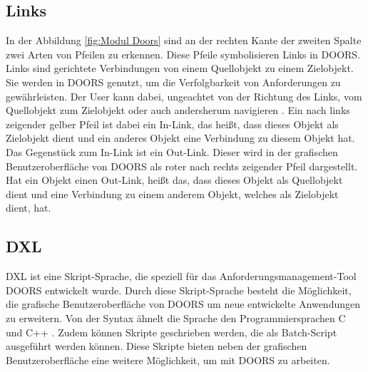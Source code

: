 \subsection{Links}
In der Abbildung \ref*{fig:Modul Doors} sind an der rechten Kante der zweiten Spalte zwei Arten von Pfeilen zu erkennen. Diese Pfeile
symbolisieren Links in \ac{DOORS}. Links sind gerichtete Verbindungen von einem Quellobjekt zu einem Zielobjekt. Sie werden in \ac{DOORS} 
genutzt, um die Verfolgbarkeit von Anforderungen zu gewährleisten. Der User kann 
dabei, ungeachtet von der Richtung des Links, vom Quellobjekt zum Zielobjekt oder auch andersherum navigieren \cite[S.183]{DOORS}. 
Ein nach links zeigender gelber Pfeil ist dabei ein In-Link, das heißt, dass dieses Objekt als Zielobjekt dient und ein anderes Objekt 
eine Verbindung zu diesem Objekt hat. Das Gegenstück zum In-Link ist ein Out-Link. Dieser wird in der grafischen Benutzeroberfläche von 
\ac{DOORS} als roter nach rechts zeigender Pfeil dargestellt. Hat ein Objekt einen Out-Link, heißt das, dass dieses Objekt als Quellobjekt 
dient und eine Verbindung zu einem anderem Objekt, welches als Zielobjekt dient, hat.   

\subsection{DXL}

\ac*{DXL} ist eine Skript-Sprache, die speziell für das Anforderungsmanagement-Tool \ac{DOORS} entwickelt wurde. Durch diese Skript-Sprache
besteht die Möglichkeit, die grafische Benutzeroberfläche von \ac{DOORS} um neue entwickelte Anwendungen zu
erweitern. Von der Syntax ähnelt die Sprache den Programmiersprachen C und C++ \cite[S.1]{DXL}. Zudem können Skripte geschrieben werden,
die als Batch-Script ausgeführt werden können. Diese Skripte bieten neben der grafischen Benutzeroberfläche eine weitere Möglichkeit, 
um mit \ac{DOORS} zu arbeiten. 
